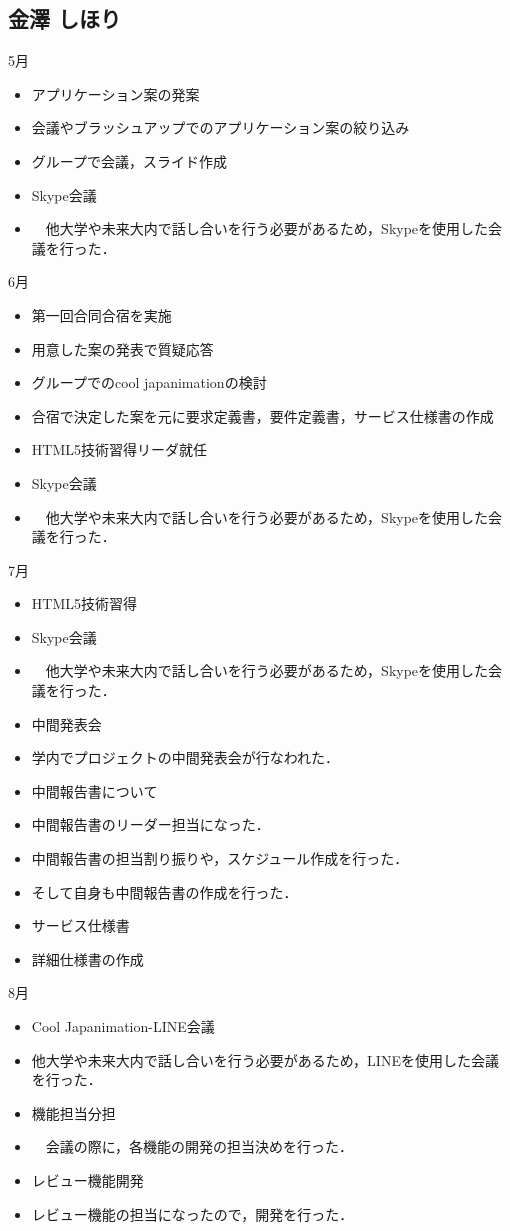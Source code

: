 \subsection{金澤 しほり}
5月
\begin{itemize}
\item アプリケーション案の発案
\item 会議やブラッシュアップでのアプリケーション案の絞り込み
\item グループで会議，スライド作成
\item Skype会議
\item 　他大学や未来大内で話し合いを行う必要があるため，Skypeを使用した会議を行った．
\end{itemize}
6月
\begin{itemize}
\item 第一回合同合宿を実施
\item 用意した案の発表で質疑応答
\item グループでのcool japanimationの検討
\item 合宿で決定した案を元に要求定義書，要件定義書，サービス仕様書の作成
\item HTML5技術習得リーダ就任
\item Skype会議
\item 　他大学や未来大内で話し合いを行う必要があるため，Skypeを使用した会議を行った．
\end{itemize}
7月
\begin{itemize}
\item HTML5技術習得
\item Skype会議
\item 　他大学や未来大内で話し合いを行う必要があるため，Skypeを使用した会議を行った．
\item 中間発表会
\item 学内でプロジェクトの中間発表会が行なわれた．
\item 中間報告書について
\item   中間報告書のリーダー担当になった．
\item   中間報告書の担当割り振りや，スケジュール作成を行った．
\item   そして自身も中間報告書の作成を行った．
\item サービス仕様書
\item 詳細仕様書の作成
\end{itemize}
8月
\begin{itemize}
\item Cool Japanimation-LINE会議
\item   他大学や未来大内で話し合いを行う必要があるため，LINEを使用した会議を行った．
\item 機能担当分担
\item 　会議の際に，各機能の開発の担当決めを行った．
\item レビュー機能開発
\item   レビュー機能の担当になったので，開発を行った．
\end{itemize}
